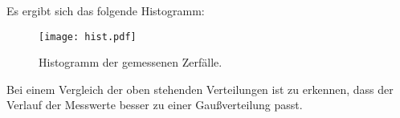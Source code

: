 Es ergibt sich das folgende Histogramm:
\begin{figure}[H]
  \centering
  \texttt{[image: hist.pdf]}
  \caption{Histogramm der gemessenen Zerfälle.}
  \label{fig:hist}
\end{figure}
Bei einem Vergleich der oben stehenden Verteilungen ist zu erkennen, dass der Verlauf der Messwerte besser zu einer Gaußverteilung passt.
